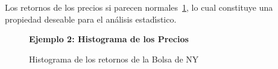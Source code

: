 \pagebreak
Los retornos de los precios si parecen normales~\ref{figura4}, lo cual constituye una propiedad deseable para el an\'alisis estad\'\i{}stico.\\
\begin{figure}[H]
	\centering
	\textbf{Ejemplo 2: Histograma de los Precios}\par\medskip
	\caption{Histograma de los retornos de la Bolsa de NY}\label{figura4}
\end{figure}


